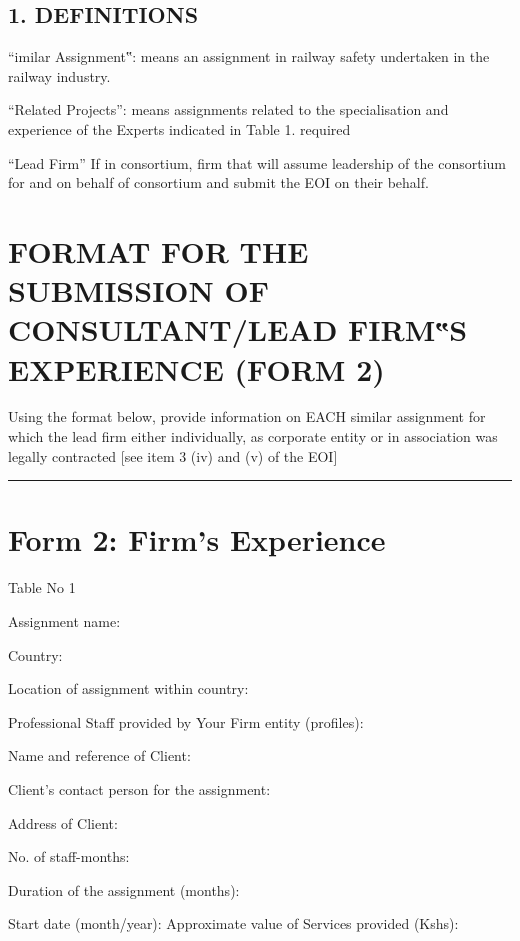 \subsection{1. DEFINITIONS}\label{definitions}

``imilar Assignment‟: means an assignment in railway safety undertaken
in the railway industry.

``Related Projects'': means assignments related to the specialisation
and experience of the Experts indicated in Table 1. required

``Lead Firm'' If in consortium, firm that will assume leadership of the
consortium for and on behalf of consortium and submit the EOI on their
behalf.

\section{FORMAT FOR THE SUBMISSION OF CONSULTANT/LEAD FIRM‟S EXPERIENCE
	(FORM
	2)}\label{format-for-the-submission-of-consultantlead-firms-experience-form-2}

Using the format below, provide information on EACH similar assignment
for which the lead firm either individually, as corporate entity or in
association was legally contracted {[}see item 3 (iv) and (v) of the
EOI{]}

\begin{center}\rule{3in}{0.4pt}\end{center}

\section{Form 2: Firm's Experience}\label{form-2-firms-experience}

Table No 1

Assignment name:

Country:

Location of assignment within country:

Professional Staff provided by Your Firm entity (profiles):

Name and reference of Client:

Client's contact person for the assignment:

Address of Client:

No. of staff-months:

Duration of the assignment (months):

Start date (month/year): Approximate value of Services provided (Kshs):

